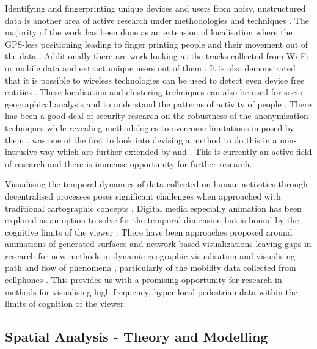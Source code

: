 Identifying and fingerprinting unique devices and users from noisy, unstructured data is another area of active research under methodologies and techniques \cite{jiang2006, liao2006}.
The majority of the work has been done as an extension of localisation where the GPS-less positioning leading to finger printing people and their movement out of the data \citep{pang2007a, pappalardo2015}.
Additionally there are work looking at the tracks collected from Wi-Fi or mobile data and extract unique users out of them \citep{girardin2008, eagle2009, jiang2012}.
It is also demonstrated that it is possible to wireless technologies can be used to detect even device free entities \citep{elgohary2013}.
These localisation and clustering techniques can also be used for socio-geographical analysis and to understand the patterns of activity of people \citep{licoppe2008}.
There has been a good deal of security research on the robustness of the anonymisation techniques while revealing methodologies to overcome limitations imposed by them \citep{mathieucunche2016, chothia2010, krumm2007}.
\citet{cheng2016} was one of the first to look into devising a method to do this in a non-intrusive way which are further extended by \citet{di2016, adamsky2018} and \citet{dai2019}.
This is currently an active field of research and there is immense opportunity for further research.

Visualising the temporal dynamics of data collected on human activities through decentralised processes poses significant challenges when approached with traditional cartographic concepts \cite{maceachren2001, hallisey2005}.
Digital media especially animation has been explored as an option to solve for the temporal dimension \citep{morrison2000, lobben2003} but is bound by the cognitive limits of the viewer \citep{harrower2007}.
There have been approaches proposed around animations of generated surfaces \citep{kobayashi2011} and network-based visualizations \citep{ferrara2014} leaving gaps in research for new methods in dynamic geographic visualisation \citep{fabrikant2005} and visualising path and flow of phenomena \citep{thomas2005}, particularly of the mobility data collected from cellphones \citep{sbodio2014}.
This provides us with a promising opportunity for research in methods for visualising high frequency, hyper-local pedestrian data within the limits of cognition of the viewer.

\subsection{Spatial Analysis - Theory and Modelling}

